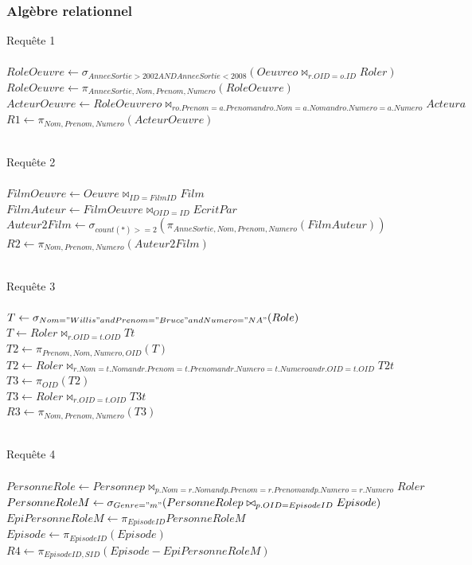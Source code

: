 \documentclass[10pt,a4paper]{article}
\begin{document}
\subsubsection{Algèbre relationnel}
\begin{list}{*}{}
\item Requête 1
\\ \\
$
RoleOeuvre \leftarrow \sigma_{ AnneeSortie > 2002 AND AnneeSortie < 2008  } ( Oeuvre o \bowtie_{ r.OID = o.ID  } Role r) 
$\\$
RoleOeuvre \leftarrow \pi_{AnneeSortie, Nom, Prenom, Numero}(RoleOeuvre) $
\\$
ActeurOeuvre \leftarrow RoleOeuvre ro \bowtie_{ro.Prenom = a.Prenom and ro.Nom = a. Nom and ro.Numero = a.Numero} Acteur a $
\\
$R1 \leftarrow \pi_{Nom, Prenom, Numero}(ActeurOeuvre)$
\\
\\
\item Requête 2
\\ \\ 
$ FilmOeuvre \leftarrow Oeuvre \bowtie_{ID = FilmID} Film$ \\ 
$FilmAuteur \leftarrow FilmOeuvre \bowtie_{OID = ID} EcritPar$ \\
$Auteur2Film \leftarrow \sigma_{count(*)>=2}(\pi_{AnneSortie, Nom, Prenom, Numero} (FilmAuteur) )$\\
$R2 \leftarrow \pi_{Nom, Prenom, Numero} (Auteur2Film)$
\\
\\

\item Requête 3
\\ \\ 
$ T \leftarrow \sigma_{Nom = "Willis" and Prenom = "Bruce" and Numero = "NA"}(Role)$ \\ 
$T \leftarrow Role r \bowtie_{r.OID = t.OID} T  t$ \\
$T2 \leftarrow \pi_{Prenom, Nom, Numero, OID}(T)$\\
$T2 \leftarrow Role r \bowtie_{r.Nom = t.Nom and r.Prenom = t.Prenom and r.Numero = t.Numero and r.OID = t.OID} T2 t$\\
$T3 \leftarrow \pi_{OID} (T2)$\\
$T3 \leftarrow Role r \bowtie_{r.OID = t.OID} T3 t$ \\
$R3 \leftarrow \pi_{Nom, Prenom, Numero} (T3)$
\\
\\
\item Requête 4
\\ \\
$PersonneRole \leftarrow Personne p \bowtie_{p.Nom = r.Nom and p.Prenom = r.Prenom and p.Numero = r.Numero} Role r$\\
$PersonneRoleM \leftarrow \sigma_{Genre = "m"}(PersonneRole p \bowtie_{p.OID = EpisodeID} Episode)$\\
$EpiPersonneRoleM \leftarrow \pi_{EpisodeID} PersonneRoleM$\\
$Episode \leftarrow \pi_{EpisodeID}(Episode)$\\
$R4 \leftarrow \pi_{EpisodeID, SID}(Episode - EpiPersonneRoleM)$
\end{list}
\newpage
\end{document}

